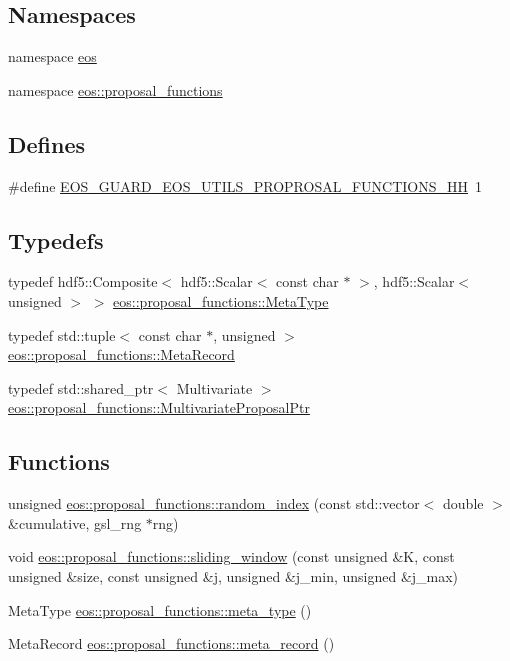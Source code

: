 \subsection*{Namespaces}
\begin{DoxyCompactItemize}
\item 
namespace \hyperlink{namespaceeos}{eos}
\item 
namespace \hyperlink{namespaceeos_1_1proposal__functions}{eos::proposal\_\-functions}
\end{DoxyCompactItemize}
\subsection*{Defines}
\begin{DoxyCompactItemize}
\item 
\#define \hyperlink{proposal__functions_8hh_adcf0d7fb0622fd69103980900bf5dfc9}{EOS\_\-GUARD\_\-EOS\_\-UTILS\_\-PROPROSAL\_\-FUNCTIONS\_\-HH}~1
\end{DoxyCompactItemize}
\subsection*{Typedefs}
\begin{DoxyCompactItemize}
\item 
typedef hdf5::Composite$<$ hdf5::Scalar$<$ const char $\ast$ $>$, hdf5::Scalar$<$ unsigned $>$ $>$ \hyperlink{namespaceeos_1_1proposal__functions_ad45af5ebbbdc545b033b153cafe7e360}{eos::proposal\_\-functions::MetaType}
\item 
typedef std::tuple$<$ const char $\ast$, unsigned $>$ \hyperlink{namespaceeos_1_1proposal__functions_a7b9711fcd1f76e034c72073e2d5d7f15}{eos::proposal\_\-functions::MetaRecord}
\item 
typedef std::shared\_\-ptr$<$ Multivariate $>$ \hyperlink{namespaceeos_1_1proposal__functions_a6cffa18d523cd6955629beabbe07c17c}{eos::proposal\_\-functions::MultivariateProposalPtr}
\end{DoxyCompactItemize}
\subsection*{Functions}
\begin{DoxyCompactItemize}
\item 
unsigned \hyperlink{namespaceeos_1_1proposal__functions_a55ba4d78e5beeb12699c697874f7c1df}{eos::proposal\_\-functions::random\_\-index} (const std::vector$<$ double $>$ \&cumulative, gsl\_\-rng $\ast$rng)
\item 
void \hyperlink{namespaceeos_1_1proposal__functions_a3714de403c64ba76dcdb901f138f48de}{eos::proposal\_\-functions::sliding\_\-window} (const unsigned \&K, const unsigned \&size, const unsigned \&j, unsigned \&j\_\-min, unsigned \&j\_\-max)
\item 
MetaType \hyperlink{namespaceeos_1_1proposal__functions_ac169711c02c184c64ba3a406bd18598b}{eos::proposal\_\-functions::meta\_\-type} ()
\item 
MetaRecord \hyperlink{namespaceeos_1_1proposal__functions_aa2f7d6804a251f162c263056d0e660e0}{eos::proposal\_\-functions::meta\_\-record} ()
\end{DoxyCompactItemize}


